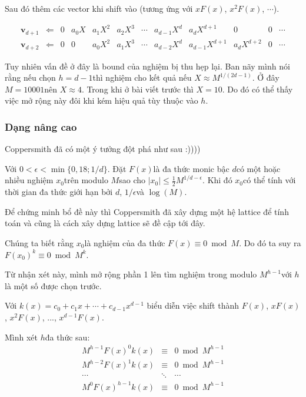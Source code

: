 Sau đó thêm các vector khi shift vào (tương ứng với $xF(x)$​, $x^2 F(x)$​, $\cdots$).​

\begin{equation*}
    \begin{array}{cccccccccccc}
        \bm{v}_{d+1} & \Leftarrow & 0 & a_0 X & a_1 X^2 & a_2 X^3 & \cdots & a_{d-1} X^d & a_d X^{d+1} & 0 & 0 & \cdots \\
        \bm{v}_{d+2} & \Leftarrow & 0 & 0 & a_0 X^2 & a_1 X^3 & \cdots & a_{d-2} X^d & a_{d-1} X^{d+1} & a_d X^{d+2} & 0 & \cdots
    \end{array}
\end{equation*}

Tuy nhiên vấn đề ở đây là bound của nghiệm bị thu hẹp lại. Ban nãy mình nói rằng nếu chọn $h=d-1$​ thì nghiệm cho kết quả nếu $X \approx M^{1/(2d-1)}$​. Ở đây $M = 10001$​ nên $X \approx 4$​. Trong khi ở bài viết trước thì $X = 10$​. Do đó có thể thấy việc mở rộng này đôi khi kém hiệu quả tùy thuộc vào $h$​.

\subsubsection*{Dạng nâng cao}

Coppersmith đã có một ý tưởng đột phá như sau :))))

\begin{lemma}[Coppersmith]
    Với $0 < \epsilon < \min \{0,18; 1/d\}$. Đặt $F(x)$​ là đa thức monic bậc $d$​ có một hoặc nhiều nghiệm $x_0$​ trên modulo $M$​ sao cho $\lvert x_0 \rvert \leqslant \frac{1}{2} M^{1/d-\epsilon}$. Khi đó $x_0$​ có thể tính với thời gian đa thức giới hạn bởi $d$​, $1/\epsilon$​ và $\log(M)$.
\end{lemma}

Để chứng minh bổ đề này thì Coppersmith đã xây dựng một hệ lattice để tính toán và cũng là cách xây dựng lattice sẽ đề cập tới đây.

Chúng ta biết rằng $x_0$​ là nghiệm của đa thức $F(x) \equiv 0 \bmod M$​. Do đó ta suy ra $F(x_0)^k \equiv 0 \bmod M^k$​.

Từ nhận xét này, mình mở rộng phần 1 lên tìm nghiệm trong modulo $M^{h-1}$​ với $h$ là một số được chọn trước.

Với $k(x) = c_0 + c_1 x + \cdots + c_{d-1} x^{d-1}$ biểu diễn việc shift thành $F(x)$, $xF(x)$​, $x^2 F(x)$, ..., $x^{d-1} F(x)$​.

Mình xét $h$​ đa thức sau:
\begin{equation*}
    \begin{array}{ccc}
        M^{h-1} F(x)^0 k(x) & \equiv & 0 \bmod M^{h-1} \\
        M^{h-2} F(x)^1 k(x) & \equiv & 0 \bmod M^{h-1} \\
        \cdots & \ddots & \cdots \\
        M^0 F(x)^{h-1} k(x) & \equiv & 0 \bmod M^{h-1}
    \end{array}
\end{equation*}


